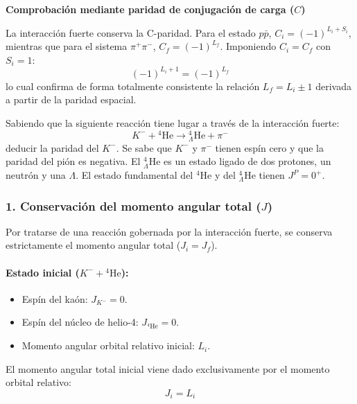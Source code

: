 \begin{problema}
\textbf{Comprobación mediante paridad de conjugación de carga ($C$)}

La interacción fuerte conserva la C-paridad. Para el estado $p\bar{p}$, $C_i = (-1)^{L_i + S_i}$, mientras que para el sistema $\pi^+\pi^-$, $C_f = (-1)^{L_f}$. Imponiendo $C_i = C_f$ con $S_i = 1$:
\begin{equation*}
    (-1)^{L_i + 1} = (-1)^{L_f}
\end{equation*}
lo cual confirma de forma totalmente consistente la relación $L_f = L_i \pm 1$ derivada a partir de la paridad espacial.
\end{problema}

\newpage
\begin{problema}
Sabiendo que la siguiente reacción tiene lugar a través de la interacción fuerte:
\begin{equation*}
K^- + {}^4\text{He} \longrightarrow {}_\Lambda^4\text{He} + \pi^-
\end{equation*}
deducir la paridad del $K^-$. Se sabe que $K^-$ y $\pi^-$ tienen espín cero y que la paridad del pión es negativa. El ${}_\Lambda^4\text{He}$ es un estado ligado de dos protones, un neutrón y una $\Lambda$. El estado fundamental del ${}^4\text{He}$ y del ${}_\Lambda^4\text{He}$ tienen $J^P = 0^+$.

\tcblower

\subsubsection*{1. Conservación del momento angular total ($J$)}

Por tratarse de una reacción gobernada por la interacción fuerte, se conserva estrictamente el momento angular total ($J_i = J_f$).

\paragraph{Estado inicial ($K^- + {}^4\text{He}$):}
\begin{itemize}
    \item Espín del kaón: $J_{K^-} = 0$.
    \item Espín del núcleo de helio-4: $J_{{}^4\text{He}} = 0$.
    \item Momento angular orbital relativo inicial: $L_i$.
\end{itemize}
El momento angular total inicial viene dado exclusivamente por el momento orbital relativo:
\begin{equation*}
J_i = L_i
\end{equation*}


\end{problema}
